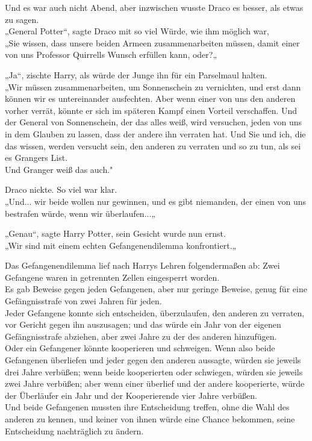 {Und es war auch nicht Abend, aber inzwischen wusste Draco es besser, als etwas zu sagen.\\ „General Potter“, sagte Draco mit so viel Würde, wie ihm möglich war,\\ „Sie wissen, dass unsere beiden Armeen zusammenarbeiten müssen, damit einer von uns Professor Quirrells Wunsch erfüllen kann, oder?„

„Ja“, zischte Harry, als würde der Junge ihn für ein Parselmaul halten.\\ „Wir müssen zusammenarbeiten, um Sonnenschein zu vernichten, und erst dann können wir es untereinander ausfechten. Aber wenn einer von uns den anderen vorher verrät, könnte er sich im späteren Kampf einen Vorteil verschaffen. Und der General von Sonnenschein, der das alles weiß, wird versuchen, jeden von uns in dem Glauben zu lassen, dass der andere ihn verraten hat. Und Sie und ich, die das wissen, werden versucht sein, den anderen zu verraten und so zu tun, als sei es Grangers List.\\ Und Granger weiß das auch."

Draco nickte. So viel war klar.\\ „Und... wir beide wollen nur gewinnen, und es gibt niemanden, der einen von uns bestrafen würde, wenn wir überlaufen...„

„Genau“, sagte Harry Potter, sein Gesicht wurde nun ernst.\\ „Wir sind mit einem echten Gefangenendilemma konfrontiert.„

Das Gefangenendilemma lief nach Harrys Lehren folgendermaßen ab: Zwei Gefangene waren in getrennten Zellen eingesperrt worden.\\ Es gab Beweise gegen jeden Gefangenen, aber nur geringe Beweise, genug für eine Gefängnisstrafe von zwei Jahren für jeden.\\ Jeder Gefangene konnte sich entscheiden, überzulaufen, den anderen zu verraten, vor Gericht gegen ihn auszusagen; und das würde ein Jahr von der eigenen Gefängnisstrafe abziehen, aber zwei Jahre zu der des anderen hinzufügen.\\ Oder ein Gefangener könnte kooperieren und schweigen. Wenn also beide Gefangenen überliefen und jeder gegen den anderen aussagte, würden sie jeweils drei Jahre verbüßen; wenn beide kooperierten oder schwiegen, würden sie jeweils zwei Jahre verbüßen; aber wenn einer überlief und der andere kooperierte, würde der Überläufer ein Jahr und der Kooperierende vier Jahre verbüßen.\\ Und beide Gefangenen mussten ihre Entscheidung treffen, ohne die Wahl des anderen zu kennen, und keiner von ihnen würde eine Chance bekommen, seine Entscheidung nachträglich zu ändern.

}
